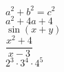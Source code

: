 \documentclass[12pt, a4paper]{article}
\begin{document}
	\( a^2+b^2=c^2 \)\\[1em]
	\( a^2+4a+4 \)\\[1em]
	\( \sin(x+y) \)\\[1em]
	\( \dfrac{x^2+4}{x-3} \)\\[1em]
	\( 2^3\cdot3^4\cdot4^5 \)
\end{document}
